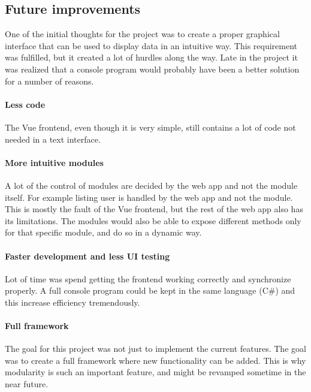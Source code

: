 \documentclass{article}
\begin{document}
\subsection{Future improvements}
One of the initial thoughts for the project was to create a proper graphical interface that can be used to display data in an intuitive way. This requirement was fulfilled, but it created a lot of hurdles along the way. Late in the project it was realized that a console program would probably have been a better solution for a number of reasons.

\paragraph{Less code} The Vue frontend, even though it is very simple, still contains a lot of code not needed in a text interface.

\paragraph{More intuitive modules} A lot of the control of modules are decided by the web app and not the module itself. For example listing user is handled by the web app and not the module. This is mostly the fault of the Vue frontend, but the rest of the web app also has its limitations. The modules would also be able to expose different methods only for that specific module, and do so in a dynamic way.
    
\paragraph{Faster development and less UI testing} Lot of time was spend getting the frontend working correctly and synchronize properly. A full console program could be kept in the same language (C\#) and this increase efficiency tremendously.

\paragraph{Full framework} The goal for this project was not just to implement the current features. The goal was to create a full framework where new functionality can be added. This is why modularity is such an important feature, and might be revamped sometime in the near future.
\end{document}
